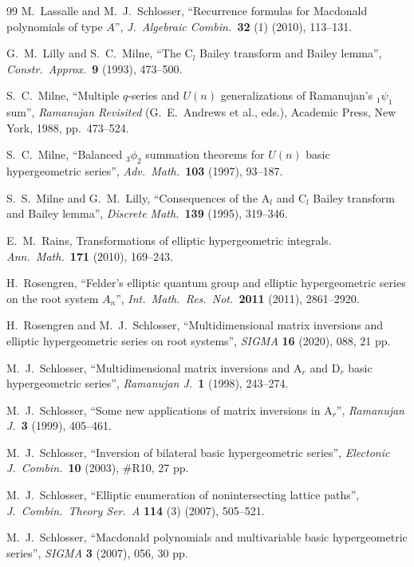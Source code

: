 \documentclass[reqno,12pt]{amsart}
\theoremstyle{remark}
\numberwithin{equation}{section}
\begin{document}
\begin{thebibliography}{99}
 M.\ Lassalle and M.~J.~Schlosser,
``Recurrence formulas for Macdonald polynomials of type $A$'',
{\em J.\ Algebraic Combin.\ }\textbf{32} (1) (2010), 113--131.

 G.\ M.\ Lilly and S.\ C.\ Milne,
``The $\mathrm C_l$ {B}ailey transform and {B}ailey lemma'',
\textit{Constr.\ Approx.\ }\textbf{9} (1993), 473--500.

 S.\ C.\ Milne,
``Multiple $q$-series and $U(n)$ generalizations of {R}amanujan's
$_1\psi_1$ sum'', \emph{Ramanujan Revisited} (G.~E.~Andrews et al.,
eds.), Academic Press, New York, 1988, pp.~473--524.

 S.\ C.\ Milne,
  ``Balanced $_3\phi_2$ summation theorems for $U(n)$ basic
  hypergeometric series'',
\emph{Adv.\ Math.\ }\textbf{103} (1997), 93--187.

S.\ S.\ Milne and G.\ M.\ Lilly,
``Consequences of the $\mathrm A_l$ and $\mathrm C_l$ {B}ailey transform
and {B}ailey lemma'',
\textit{Discrete Math.\ }\textbf{139} (1995), 319--346.

E.\ M.\ Rains,
Transformations of elliptic hypergeometric integrals.
\textit{Ann.\ Math.\ }\textbf{171} (2010), 169--243.

 H.\ Rosengren,
``Felder's elliptic quantum group and elliptic hypergeometric
series on the root system $A_n$'',
{\em Int.\ Math.\ Res.\ Not.\ }\textbf{2011} (2011), 2861--2920. 

 H.\ Rosengren and M.\ J.\ Schlosser,
``Multidimensional matrix inversions and
elliptic hypergeometric series on root systems'',
{\em SIGMA} \textbf{16} (2020), 088, 21 pp.

 M.\ J.\ Schlosser,
  ``Multidimensional matrix inversions and $\mathrm A_r$
  and $\mathrm D_r$ basic hypergeometric series'',
\textit{Ramanujan J.\ }\textbf{1} (1998), 243--274.

 M.\ J.\ Schlosser,
``Some new applications of matrix inversions in $\mathrm A_r$'',
\textit{Ramanujan J.\ }\textbf{3} (1999), 405--461.

 M.~J.~Schlosser,
``Inversion of bilateral basic hypergeometric series'',
{\em Electonic J.\ Combin.\ }\textbf{10} (2003), \#R10, 27 pp.

 M.~J.~Schlosser,
``Elliptic enumeration of nonintersecting lattice paths'',
{\em J.\ Combin.\ Theory Ser.\ A }\textbf{114} (3) (2007), 505--521.

 M.\ J.\ Schlosser,
``{M}acdonald polynomials and multivariable basic hypergeometric series'',
\textit{SIGMA} \textbf{3} (2007), 056, 30 pp.


\end{thebibliography}
\end{document}
